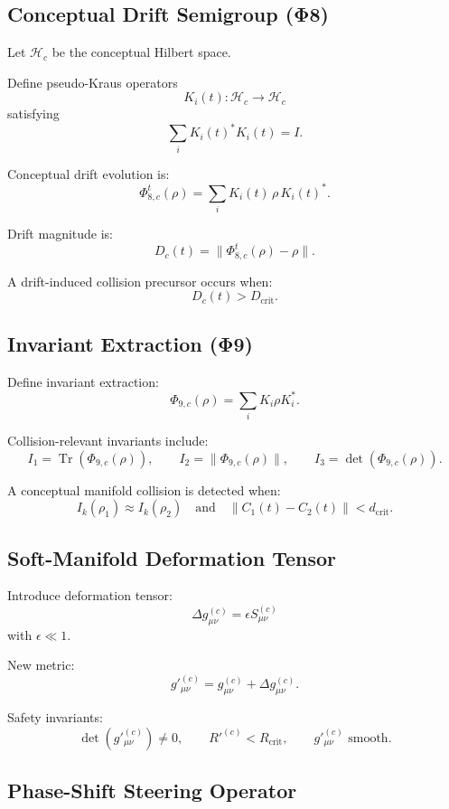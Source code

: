 \subsection{Conceptual Drift Semigroup (Φ8)}

Let $\mathcal{H}_c$ be the conceptual Hilbert space.

Define pseudo-Kraus operators
\[
K_i(t) : \mathcal{H}_c \to \mathcal{H}_c
\]
satisfying
\[
\sum_i K_i(t)^\ast K_i(t) = I.
\]

Conceptual drift evolution is:
\[
\Phi_{8,c}^t(\rho)
  = \sum_i K_i(t)\,\rho\,K_i(t)^\ast.
\]

Drift magnitude is:
\[
D_c(t) = \|\Phi_{8,c}^t(\rho) - \rho\|.
\]

A drift-induced collision precursor occurs when:
\[
D_c(t) > D_{\text{crit}}.
\]

\subsection{Invariant Extraction (Φ9)}

Define invariant extraction:
\[
\Phi_{9,c}(\rho)
  = \sum_i K_i \rho K_i^\ast.
\]

Collision-relevant invariants include:
\[
I_1 = \operatorname{Tr}(\Phi_{9,c}(\rho)),
\qquad
I_2 = \|\Phi_{9,c}(\rho)\|,
\qquad
I_3 = \det(\Phi_{9,c}(\rho)).
\]

A conceptual manifold collision is detected when:
\[
I_k(\rho_1) \approx I_k(\rho_2)
\quad\text{and}\quad
\|C_1(t) - C_2(t)\| < d_{\text{crit}}.
\]

\subsection{Soft-Manifold Deformation Tensor}

Introduce deformation tensor:
\[
\Delta g^{(c)}_{\mu\nu} = \epsilon S^{(c)}_{\mu\nu}
\]
with $\epsilon \ll 1$.

New metric:
\[
g'^{(c)}_{\mu\nu} = g^{(c)}_{\mu\nu} + \Delta g^{(c)}_{\mu\nu}.
\]

Safety invariants:
\[
\det(g'^{(c)}_{\mu\nu}) \neq 0,
\qquad
R'^{(c)} < R_{\text{crit}},
\qquad
g'^{(c)}_{\mu\nu} \text{ smooth}.
\]

\subsection{Phase-Shift Steering Operator}


